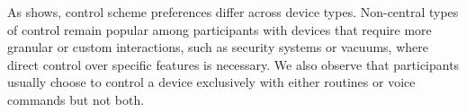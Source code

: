 As  shows, control scheme preferences differ across device types. Non-central types of control remain popular among participants with devices that require more granular or custom interactions, such as security systems or vacuums, where direct control over specific features is necessary. We also observe that participants usually choose to control a device exclusively with either routines or voice commands but not both.

